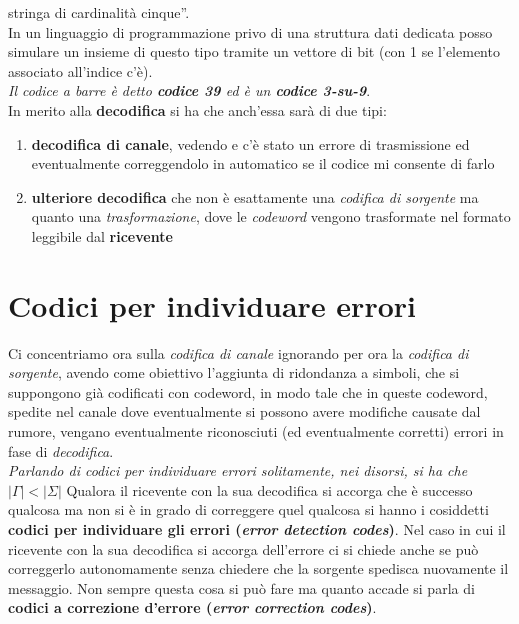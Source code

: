 \documentclass[a4paper,12pt, oneside]{book}
\begin{document}
stringa di cardinalità cinque''.\\
In un linguaggio di programmazione privo di una struttura dati dedicata posso
simulare un insieme di questo tipo tramite un vettore di bit (con 1 se
l'elemento associato all'indice c'è).\\
\textit{Il codice a barre è detto \textbf{codice 39} ed è un \textbf{codice
    3-su-9}}. \\
In merito alla \textbf{decodifica} si ha che anch'essa sarà di due tipi:
\begin{enumerate}
  \item \textbf{decodifica di canale}, vedendo e c'è stato un errore di
  trasmissione ed eventualmente correggendolo in automatico se il codice mi
  consente di farlo
  \item \textbf{ulteriore decodifica} che non è esattamente una \textit{codifica
    di sorgente} ma quanto una \textit{trasformazione}, dove le
  \textit{codeword} vengono trasformate nel formato leggibile dal
  \textbf{ricevente} 
\end{enumerate}
\section{Codici per individuare errori}
Ci concentriamo ora sulla \textit{codifica di canale} ignorando per ora la
\textit{codifica di sorgente}, avendo come obiettivo l'aggiunta di ridondanza a
simboli, che si suppongono già codificati con codeword, in modo tale che in
queste codeword, spedite nel canale dove eventualmente si possono avere
modifiche causate dal rumore, vengano eventualmente riconosciuti (ed
eventualmente corretti) errori in fase di \textit{decodifica}.\\
\textit{Parlando di codici per individuare errori solitamente, nei disorsi, si
  ha che $|\Gamma|<|\Sigma|$}
Qualora il ricevente con la sua decodifica si accorga che è successo qualcosa ma
non si è in grado di 
correggere quel qualcosa si hanno i cosiddetti \textbf{codici per individuare
  gli errori (\textit{error detection codes})}. Nel caso in cui il ricevente con
la sua decodifica si accorga dell'errore ci si chiede anche se può correggerlo
autonomamente senza chiedere che la sorgente spedisca nuovamente il
messaggio. Non sempre questa cosa si può fare ma quanto accade si parla di
\textbf{codici a correzione d'errore (\textit{error correction codes})}.
\end{document}
